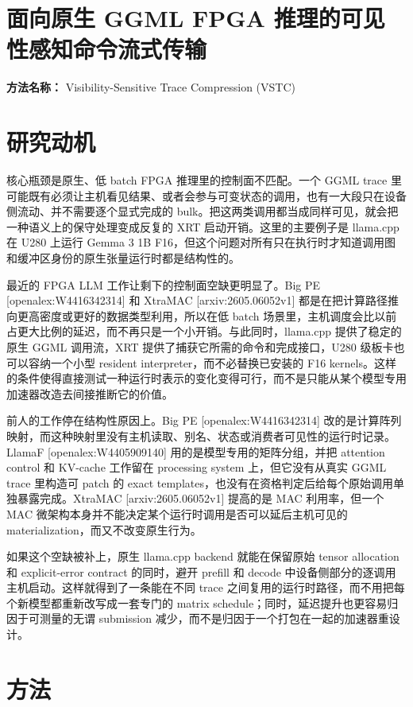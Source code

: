 \documentclass[10pt,a4paper]{article}
\begin{document}
\section*{面向原生 GGML FPGA 推理的可见性感知命令流式传输}
\textbf{方法名称：} Visibility-Sensitive Trace Compression (VSTC)
\section*{研究动机}
核心瓶颈是原生、低 batch FPGA 推理里的控制面不匹配。一个 GGML trace 里可能既有必须让主机看见结果、或者会参与可变状态的调用，也有一大段只在设备侧流动、并不需要逐个显式完成的 bulk。把这两类调用都当成同样可见，就会把一种语义上的保守处理变成反复的 XRT 启动开销。这里的主要例子是 llama.cpp 在 U280 上运行 Gemma 3 1B F16，但这个问题对所有只在执行时才知道调用图和缓冲区身份的原生张量运行时都是结构性的。

最近的 FPGA LLM 工作让剩下的控制面空缺更明显了。Big PE [openalex:W4416342314] 和 XtraMAC [arxiv:2605.06052v1] 都是在把计算路径推向更高密度或更好的数据类型利用，所以在低 batch 场景里，主机调度会比以前占更大比例的延迟，而不再只是一个小开销。与此同时，llama.cpp 提供了稳定的原生 GGML 调用流，XRT 提供了捕获它所需的命令和完成接口，U280 级板卡也可以容纳一个小型 resident interpreter，而不必替换已安装的 F16 kernels。这样的条件使得直接测试一种运行时表示的变化变得可行，而不是只能从某个模型专用加速器改造去间接推断它的价值。

前人的工作停在结构性原因上。Big PE [openalex:W4416342314] 改的是计算阵列映射，而这种映射里没有主机读取、别名、状态或消费者可见性的运行时记录。LlamaF [openalex:W4405909140] 用的是模型专用的矩阵分组，并把 attention control 和 KV-cache 工作留在 processing system 上，但它没有从真实 GGML trace 里构造可 patch 的 exact templates，也没有在资格判定后给每个原始调用单独暴露完成。XtraMAC [arxiv:2605.06052v1] 提高的是 MAC 利用率，但一个 MAC 微架构本身并不能决定某个运行时调用是否可以延后主机可见的 materialization，而又不改变原生行为。

如果这个空缺被补上，原生 llama.cpp backend 就能在保留原始 tensor allocation 和 explicit-error contract 的同时，避开 prefill 和 decode 中设备侧部分的逐调用主机启动。这样就得到了一条能在不同 trace 之间复用的运行时路径，而不用把每个新模型都重新改写成一套专门的 matrix schedule；同时，延迟提升也更容易归因于可测量的无谓 submission 减少，而不是归因于一个打包在一起的加速器重设计。
\section*{方法}
\end{document}
